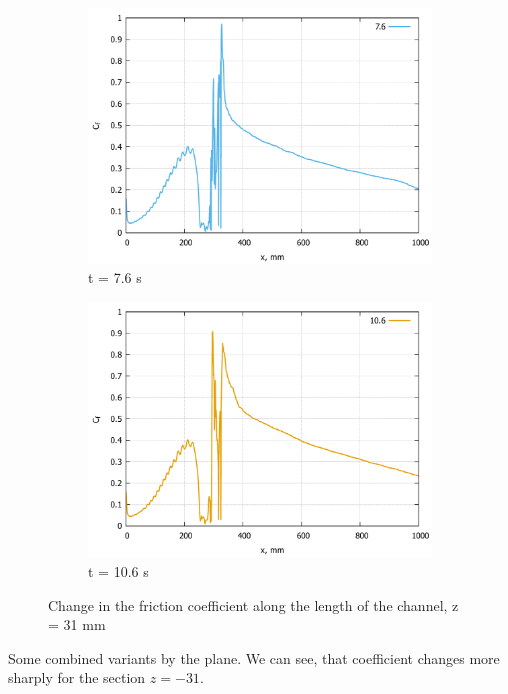 \begin{figure}[H]
\begin{subfigure}{.5\textwidth}
			\includegraphics[width=1\linewidth]{../Assets/Cf-T760-31p}
			\caption{t = 7.6 s}
			\label{fig:Cf-T760-31p}
		\end{subfigure}%
		\begin{subfigure}{.5\textwidth}
			\centering
			\includegraphics[width=1\linewidth]{../Assets/Cf-T1060-31p}
			\caption{t = 10.6 s}
			\label{fig:Cf-T1060-31p}
		\end{subfigure}
		\caption{Change in the friction coefficient along the length of the channel, z = 31 mm}
		\label{fig:cf-31p}
	\end{figure}
	\newpage
	Some combined variants by the plane. We can see, that coefficient changes more sharply for the section $z = -31$.
